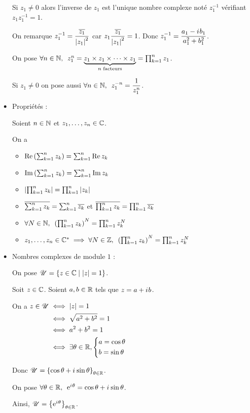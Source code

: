 \begin{rappel}
\begin{itemize}
Si \(z_1\not=0\) alors l'inverse de \(z_1\) est l'unique nombre complexe noté \(z_1^{-1}\) vérifiant \(z_1z_1^{-1}=1\).

On remarque \(z_1^{-1}=\dfrac{\overline{z_1}}{\left\lvert z_1\right\rvert^2}\) car \(z_1\dfrac{\overline{z_1}}{\left\lvert z_1\right\rvert^2}=1\). Donc \(z_1^{-1}=\dfrac{a_1-i\mkern1mu b_1}{a_1^2+b_1^2}\).

On pose \(\quantifs{\forall n\in\N}z_1^n=\underbrace{z_1\times z_1\times\dots\times z_1}_\text{$n$ facteurs}=\prod_{k=1}^nz_1\).

Si \(z_1\not=0\) on pose aussi \(\quantifs{\forall n\in\N}z_1^{-n}=\dfrac{1}{z_1^n}\).

\item Propriétés :

Soient \(n\in\mathbb{N}\) et \(z_1,\dots,z_n\in\mathbb{C}\).

On a \begin{itemize}
\item \(\operatorname{Re}\left(\sum_{k=1}^nz_k\right)=\sum_{k=1}^{n}\operatorname{Re} z_k\)

\item \(\operatorname{Im}\left(\sum_{k=1}^nz_k\right)=\sum_{k=1}^{n}\operatorname{Im} z_k\)

\item \(\left\lvert\prod_{k=1}^nz_k\right\rvert=\prod_{k=1}^n\left\lvert z_k\right\rvert\)

\item \(\overline{\sum_{k=1}^nz_k}=\sum_{k=1}^n\overline{z_k}\) et \(\overline{\prod_{k=1}^nz_k}=\prod_{k=1}^n\overline{z_k}\)

\item \(\quantifs{\forall N\in\N}\paren{\prod_{k=1}^nz_k}^N=\prod_{k=1}^nz_k^N\)

\item \(z_1,\dots,z_n\in\Cs\imp\quantifs{\forall N\in\Z}\paren{\prod_{k=1}^nz_k}^N=\prod_{k=1}^nz_k^N\)
\end{itemize}

\item Nombres complexes de module \(1\) :

On pose \(\mathscr{U}=\left\lbrace z\in\mathbb{C}\;\middle|\;\left\lvert z\right\rvert=1\right\rbrace\).

Soit \(z\in\mathbb{C}\). Soient \(a,b\in\mathbb{R}\) tels que \(z=a+i\mkern1mu b\).

On a \(\begin{aligned}[t]
z\in\mathscr{U}&\iff\left\lvert z\right\rvert=1 \\
&\iff\sqrt{a^2+b^2}=1 \\
&\iff a^2+b^2=1 \\
&\iff\exists\theta\in\mathbb{R},\begin{dcases}a=\cos\theta \\ b=\sin\theta\end{dcases}
\end{aligned}\)

Donc \(\mathscr{U}=\left\lbrace\cos\theta+i\mkern1mu\sin\theta\right\rbrace_{\theta\in\mathbb{R}}\).

On pose \(\quantifs{\forall\theta\in\R}\e{\i\theta}=\cos\theta+\i\sin\theta\).

Ainsi, \(\mathscr{U}=\left\lbrace\mathrm{e}^{i\mkern1mu\theta}\right\rbrace_{\theta\in\mathbb{R}}\).
\end{itemize}
\end{rappel}

